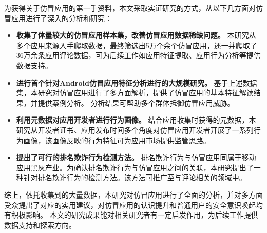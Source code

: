为获得关于仿冒应用的第一手资料，本文采取实证研究的方式，从以下几方面对仿冒应用进行了深入的分析和研究：
%
\vspace{-5mm}
\begin{itemize}
    \setlength{\itemsep}{1pt}
    \setlength{\parskip}{0pt}
    \setlength{\parsep}{0pt}
    \item \textbf{收集了体量较大的仿冒应用样本集，改善仿冒应用数据稀缺问题。}
    本研究从多个应用来源入手爬取数据，最终筛选出5万个余个仿冒应用，还一并爬取了36万余条应用评论数据，可为后续工作如应用特征提取、应用行为分析等提供数据支持。

    \item \textbf{进行首个针对Android仿冒应用特征分析进行的大规模研究。}
    基于上述数据集，本研究对仿冒应用进行了多方面解析，提供了仿冒应用的基本特征解读结果，并提供案例分析。
    分析结果可帮助多个群体抵御仿冒应用威胁。

    \item \textbf{利用元数据对应用开发者进行行为画像。}
    结合应用收集时获得的元数据，本研究从开发者证书、应用发布时间多个角度对仿冒应用开发者开展了一系列行为画像，该画像反映的行为特征可为应用市场提供监管思路。

    \item \textbf{提出了可行的排名欺诈行为检测方法。}
    排名欺诈行为与仿冒应用同属于移动应用黑灰产业。为确认排名欺诈行为与仿冒应用之间的关联，本研究提出了一种针对排名欺诈行为的检测方法。该方法可推广至与评论相关的领域中。
\end{itemize}
\vspace{-3mm}

综上，依托收集到的大量数据，本研究对仿冒应用进行了全面的分析，并对多方面受众提出了对应的实用建议，对仿冒应用的认识提升和普通用户的安全意识唤起均有积极影响。
本文的研究成果能对相关研究者有一定启发作用，为后续工作提供数据支持和探索方向。

 
